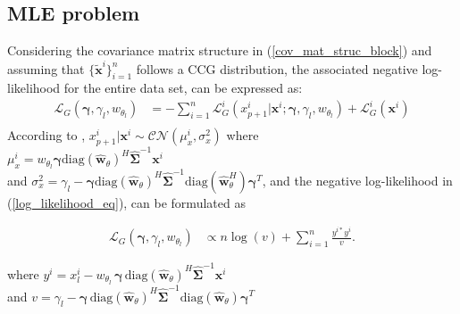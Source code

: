 \subsection{\ac{MLE} problem}
\label{sssec:MLE_prob}
Considering the covariance matrix structure in (\ref{cov_mat_struc_block}) and assuming that $\{\mathbf{\tilde{x}}^i\}_{i=1}^n$ follows a \acs{CCG} distribution, the associated negative log-likelihood for the entire data set, can be expressed as:
\vspace{-20pt} 
\begin{equation}
\label{log_likelihood_eq}
\begin{aligned}
    \mathcal{L}_G(\boldsymbol{\gamma}, \gamma_{l}, w_{\theta_{l}}) &= - \sum_{i=1}^n \mathcal{L}_G^i(x_{p+1}^i | \mathbf{x}^i; \boldsymbol{\gamma}, \gamma_{l}, w_{\theta_{l}}) + \mathcal{L}_G^i(\mathbf{x}^i) \\
\end{aligned}
\end{equation}
According to \citep{anderson1958introduction}, %
$x_{p+1}^i|\mathbf{x}^i \sim \mathcal{CN}(\mu_x^i, \sigma^2_x)$ 
where \\ 
$\mu_x^i = w_{\theta_{l}} \boldsymbol{\gamma} \text{diag}(\hat{\mathbf{w}}_{\theta})^H\hat{\mathbf{\Sigma}}^{-1} \mathbf{x}^i$ \\
and $\sigma^2_x = \gamma_l - \boldsymbol{\gamma} \text{diag}(\hat{\mathbf{w}}_{\theta})^H \hat{\mathbf{\Sigma}}^{-1}  \text{diag}(\hat{\mathbf{w}}_{\theta}^H) \boldsymbol{\gamma}^T$, and the negative log-likelihood in (\ref{log_likelihood_eq}), can be formulated as 

\begin{equation}
\label{log_likelihood_eq_final}
\begin{aligned}
    \mathcal{L}_G(\boldsymbol{\gamma}, \gamma_{l}, w_{\theta_{l}}) &\propto n \log\left( v \right) + \sum_{i=1}^n \frac{y^{i*} y^i}{v}.
\end{aligned}
\end{equation}

where $y^i = x_{l}^i - w_{\theta_{l}} \, \boldsymbol{\gamma} \, \text{diag}(\hat{\mathbf{w}}_{\theta})^H \hat{\mathbf{\Sigma}}^{-1} \mathbf{x}^i$ \\
and $v = \gamma_{l} - \boldsymbol{\gamma} \, \text{diag}(\hat{\mathbf{w}}_{\theta})^H \hat{\mathbf{\Sigma}}^{-1} \text{diag}(\hat{\mathbf{w}}_{\theta}) \boldsymbol{\gamma}^T$

